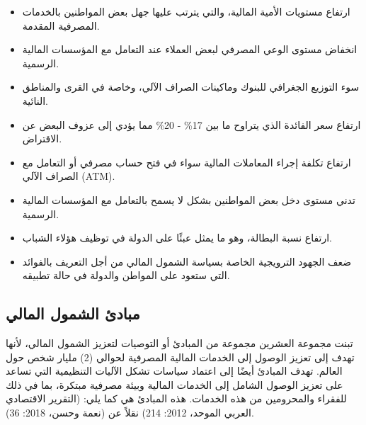 \documentclass[10pt,a4paper]{report}
\begin{document}
\begin{doublespacing}
\begin{itemize}
	\item ارتفاع مستويات الأمية المالية، والتي يترتب عليها جهل بعض المواطنين بالخدمات المصرفية المقدمة.
	\item انخفاض مستوى الوعي المصرفي لبعض العملاء عند التعامل مع المؤسسات المالية الرسمية.
	\item سوء التوزيع الجغرافي للبنوك وماكينات الصراف الآلي، وخاصة في القرى والمناطق النائية.
	\item ارتفاع سعر الفائدة الذي يتراوح ما بين 17\% - 20\% مما يؤدي إلى عزوف البعض عن الاقتراض.
	\item ارتفاع تكلفة إجراء المعاملات المالية سواء في فتح حساب مصرفي أو التعامل مع الصراف الآلي (ATM).
	\item تدني مستوى دخل بعض المواطنين بشكل لا يسمح بالتعامل مع المؤسسات المالية الرسمية.
	\item ارتفاع نسبة البطالة، وهو ما يمثل عبئًا على الدولة في توظيف هؤلاء الشباب.
	\item ضعف الجهود الترويجية الخاصة بسياسة الشمول المالي من أجل التعريف بالفوائد التي ستعود على المواطن والدولة في حالة تطبيقه.
\end{itemize}
\subsection{مبادئ الشمول المالي}
تبنت مجموعة العشرين مجموعة من المبادئ أو التوصيات لتعزيز الشمول المالي، لأنها تهدف إلى تعزيز الوصول إلى الخدمات المالية المصرفية لحوالي (2) مليار شخص حول العالم. تهدف المبادئ أيضًا إلى اعتماد سياسات تشكل الآليات التنظيمية التي تساعد على تعزيز الوصول الشامل إلى الخدمات المالية وبيئة مصرفية مبتكرة، بما في ذلك للفقراء والمحرومين من هذه الخدمات. هذه المبادئ هي كما يلي: (التقرير الاقتصادي العربي الموحد، 2012: 214) نقلاً عن (نعمة وحسن، 2018: 36).


\end{doublespacing}
\end{document}
